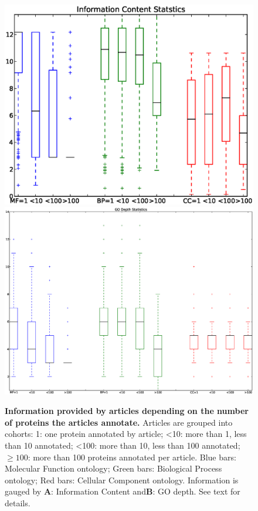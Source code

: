 \documentclass[12pt]{article}
\begin{document}
\begin{figure}[!ht]
\begin{center}
\includegraphics[width=6in]{boxplots-IC.eps}
\includegraphics[width=5in]{boxplots-GOdepth.eps}
\end{center}
\caption{
{\bf Information provided by articles depending on the number of proteins the articles annotate.}
Articles are grouped into cohorts: 1: one protein annotated by article; <10: more than 1, less than 10
annotated; <100: more than 10, less than 100 annotated; $\ge 100$: more than 100 proteins annotated per
article. Blue bars: Molecular Function ontology; Green bars: Biological Process ontology; Red bars:
Cellular Component ontology. Information is gauged by {\bf A}: Information Content and{\bf B}: GO depth.
See text for details.}
\label{fig:rel-contrib}
\end{figure}
\clearpage
\end{document}
